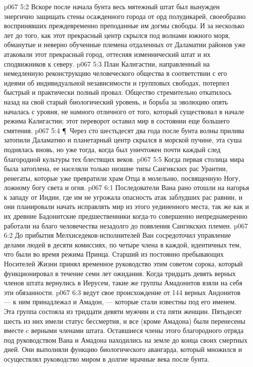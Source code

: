 \vs p067 5:2 Вскоре после начала бунта весь мятежный штат был вынужден энергично защищать стены осажденного города от орд полудикарей, своеобразно воспринявших преждевременно преподанные им догмы свободы. И за несколько лет до того, как этот прекрасный центр скрылся под волнами южного моря, обманутые и неверно обученные племена отдаленных от Даламатии районов уже атаковали этот прекрасный город, оттесняя изменнический штат и их сподвижников к северу.
\vs p067 5:3 План Калигастии, направленный на немедленную реконструкцию человеческого общества в соответствии с его идеями об индивидуальной независимости и групповых свободах, потерпел быстрый и практически полный провал. Общество стремительно откатилось назад на свой старый биологический уровень, и борьба за эволюцию опять началась с уровня, не намного отличного от того, который существовал в начале режима Калигастии; этот переворот оставил мир в состоянии еще большего смятения.
\vs p067 5:4 \P\ Через сто шестьдесят два года после бунта волны прилива затопили Даламатию и планетарный центр скрылся в морской пучине, эта суша поднялась вновь, но уже тогда, когда был уничтожен почти каждый след благородной культуры тех блестящих веков.
\vs p067 5:5 Когда первая столица мира была затоплена, ее населяли только низшие типы Сангикских рас Урантии, ренегаты, которые уже превратили храм Отца в молельню, посвященную Ногу, ложному богу света и огня.
\vs p067 6:1 Последователи Вана рано отошли на нагорья к западу от Индии, где им не угрожала опасность атак заблудших рас равнин, и они планировали начать исправлять мир из этого уединенного места, так же как и их древние Бадонитские предшественники когда\hyp{}то совершенно непреднамеренно работали на благо человечества незадолго до появления Сангикских племен.
\vs p067 6:2 До прибытия Мелхиседеков\hyp{}исполнителей Ван сосредоточил управление делами людей в десяти комиссиях, по четыре члена в каждой, идентичных тем, что были во время режима Принца. Старший из постоянно пребывающих Носителей Жизни принял временное руководство этим советом сорока, который функционировал в течение семи лет ожидания. Когда тридцать девять верных членов штата вернулись в Иерусем, такие же группы Амадонитов взяли на себя эти обязанности.
\vs p067 6:3  ведут свое происхождение от 144 верных Андонитов --- к ним принадлежал и Амадон, --- которые стали известны под его именем. Эта группа состояла из тридцати девяти мужчин и ста пяти женщин. Пятьдесят шесть из них имели статус бессмертия, и все (кроме Амадона) были перенесены вместе c верными членами штата. Оставшиеся члены этого благородного отряда под руководством Вана и Амадона находились на земле до конца своих смертных дней. Они выполняли функцию биологического авангарда, который множился и осуществлял руководство миром в долгие мрачные века после бунта.

